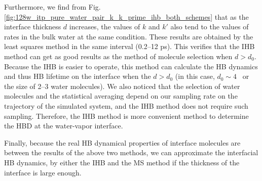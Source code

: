 Furthermore, we find from Fig.\thinspace\ref{fig:128w_itp_pure_water_pair_k_k_prime_ihb_both_schemes} that as the interface thickness $d$ increases, 
the values of $k$ and $k'$ also tend to the values of rates in the bulk water at the same condition.
These results are obtained by the least squares method in the same interval (0.2--12 ps). This verifies that the IHB method 
can get as good results as the method of molecule selection  when $d>d_0$. 
Because the IHB is easier to operate, this method can calculate the HB dynamics and thus HB lifetime on the interface 
when the $d>d_0$ (in this case, $d_0 \sim 4$ \A \ or the size of 2--3 water molecules).
We also noticed that the selection of water molecules and the statistical averaging depend on our sampling rate on the trajectory of the simulated system, 
and the IHB method does not require such sampling. Therefore, the IHB method is more convenient method to determine the HBD at the water-vapor interface.

Finally, because the real HB dynamical properties of interface molecules are between the results of the above two methods, 
we can approximate the interfacial HB dynamics, by either the IHB and the MS method if the thickness of the interface is large enough. 


